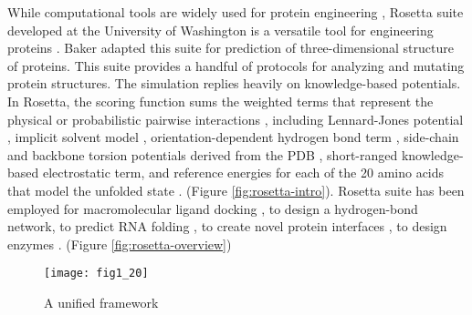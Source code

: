 \begin{refsection}
While computational tools are widely used for protein
engineering \cite{Rothlisberger2008,DiMaio2011a,Korkegian2005,
Leaver-Fay2013a,Leaver-Fay2011,Drew2013a,Kaufmann2010,Rohl2004}, Rosetta suite
developed at the University of Washington is a versatile tool for engineering
proteins \cite{Leaver-Fay2011}. Baker  adapted this suite for
prediction of three-dimensional structure of proteins\cite{Leaver-Fay2011}.
This suite provides a handful of protocols for analyzing and mutating protein
structures.  The simulation replies heavily on knowledge-based potentials. In
Rosetta, the scoring function sums the weighted terms that represent the
physical or probabilistic pairwise interactions \cite{Rohl2004}, including
Lennard-Jones potential \cite{Clementi1999}, implicit solvent
model \cite{Lazaridis1999}, orientation-dependent hydrogen bond
term \cite{Kortemme2003}, side-chain and backbone torsion potentials derived from
the PDB \cite{Rohl2002}, short-ranged knowledge-based electrostatic
term\cite{Leaver-Fay2013a}, and reference energies for each of the 20 amino
acids that model the unfolded state \cite{Leaver-Fay2013a}. (Figure
\ref{fig:rosetta-intro}). Rosetta suite has been employed for
macromolecular ligand docking \cite{Willcox2003}, to design a hydrogen-bond
network\cite{Rohl2004}, to predict RNA folding \cite{Das2007,Egli2002}, to
create novel protein interfaces \cite{Jiang2008,Hennig2002}, to design
enzymes \cite{Ashworth2006a}. (Figure \ref{fig:rosetta-overview})
\begin{figure}[h!] \centering \texttt{[image: fig1\_20]}
    \caption[A unified framework for tackling multiple molecular modeling
        problems. Each panel depicts a problem in biomolecule structure
        prediction or design (left) and a diagram of the atom-tree
        representation used by Rosetta (right); (A) \emph{de novo} structure
        prediction for the phage 434 repressor protein (PDB code: 1R69); (B)
        loop modeling carried out during comparative modeling of the CASP7
        target T0331, pyridoxamine 5′-phosphate oxidase-related protein (2HHZ);
        (C) Protein-protein docking for a host and viral major
        histocompatibility complex receptor (1P7Q); (D) Protein-protein docking
        with backbone flexibility limited to a hinge region (red) and to a loop
        (blue); (E) Symmetric folding and docking to model the coiled-coil
        trimerization motif of coronin 1 (2AKF); (F) Symmetry-constrained
        modeling of the sequence NNQQNY from prion Sup35] {A unified framework
}
\end{figure}
\end{refsection}
